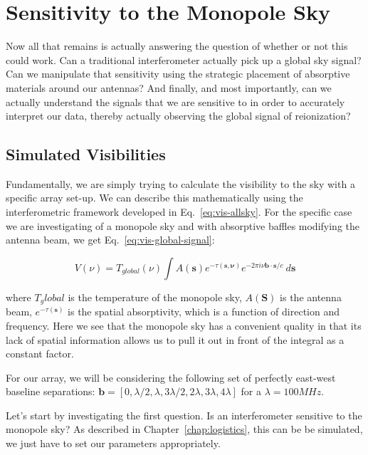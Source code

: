 \chapter{Sensitivity to the Monopole Sky}

Now all that remains is actually answering the question of whether or not this 
could work.  Can a traditional interferometer actually pick up a global sky 
signal?  Can we manipulate that sensitivity using the strategic placement of 
absorptive materials around our antennas? And finally, and most importantly, 
can we actually understand the signals that we are sensitive to in order to 
accurately interpret our data, thereby actually observing the global signal of 
reionization?

\section{Simulated Visibilities}

Fundamentally, we are simply trying to calculate the visibility to the sky with 
a specific array set-up. We can describe this mathematically using the 
interferometric framework developed in Eq.~\eqref{eq:vis-allsky}. For the 
specific case we are investigating of a monopole sky and with absorptive 
baffles modifying the antenna beam, we get Eq.~\eqref{eq:vis-global-signal}:

\begin{equation}
 V(\nu) = T_{global}(\nu) \int A(\mathbf{s}) e^{-\tau(\mathbf{s,\nu})} e^{-2\pi 
 i \nu \mathbf{b}\cdot\mathbf{s}/c} ~d\mathbf{s}
    \label{eq:vis-global-signal}
\end{equation}

where $T_global$ is the temperature of the monopole sky, $A(\mathbf{S})$ is the 
antenna beam, $e^{-\tau(\mathbf{s})}$ is the spatial absorptivity, which is a 
function of direction and frequency. Here we see that the monopole sky has a 
convenient quality in that its lack of spatial information allows us to pull it 
out in front of the integral as a constant factor.

For our array, we will be considering the following set of perfectly east-west 
baseline separations: $\mathbf{b} = [0, \lambda/2, \lambda, 3\lambda/2, 
2\lambda, 3\lambda, 4\lambda]$ for a $\lambda = 100 MHz$.

Let's start by investigating the first question. Is an interferometer sensitive 
to the monopole sky? As described in Chapter~\ref{chap:logistics}, this can be 
be simulated, we just have to set our parameters appropriately.

